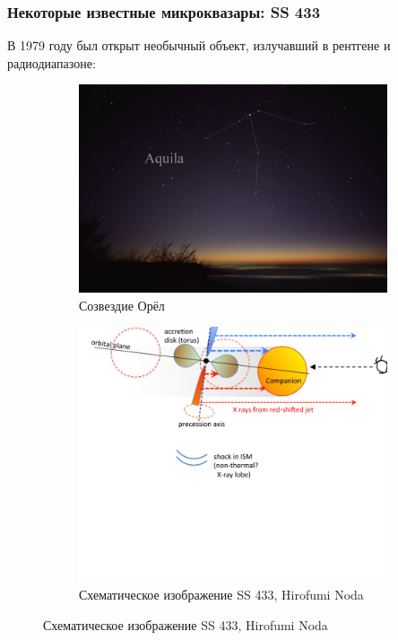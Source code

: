 \documentclass[8pt]{beamer}
\begin{document}
\begin{frame}
	\frametitle{Некоторые известные микроквазары: SS 433}
	В 1979 году был открыт необычный объект, излучавший в рентгене и радиодиапазоне:
	\begin{figure}[h]
		\begin{subfigure}{0.45\textwidth}
		    \centering
			\includegraphics[height=.5\linewidth]{resources/AquilaCC.jpg}
			\caption{Созвездие Орёл}
		\end{subfigure}
		\begin{subfigure}{0.45\textwidth}
		    \centering
			\includegraphics[height=.5\linewidth]{resources/ss-433-schematic-view.png}
			\caption{Схематическое изображение SS 433, Hirofumi Noda}
		\end{subfigure}

	\end{figure}

\end{frame}
\end{document}
